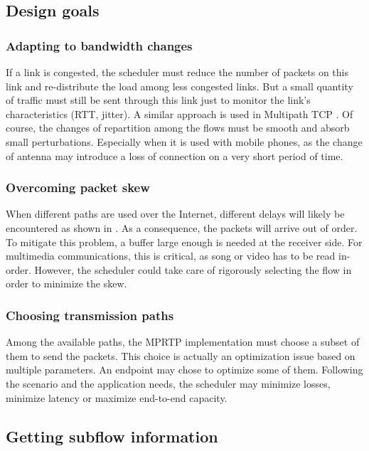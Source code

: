 \subsection{Design goals}

\subsubsection{Adapting to bandwidth changes}

If a link is congested, the scheduler must reduce the number of packets on this link and re-distribute the load among less congested links. But a small quantity of traffic must still be sent through this link just to monitor the link's characteristics (RTT, jitter). A similar approach is used in Multipath TCP \cite{wischik2011design}. Of course, the changes of repartition among the flows must be smooth and absorb small perturbations. Especially when it is used with mobile phones, as the change of antenna may introduce a loss of connection on a very short period of time.

\subsubsection{Overcoming packet skew}

When different paths are used over the Internet, different delays will likely be encountered as shown in \cite{PCVB13}. As a consequence, the packets will arrive out of order. To mitigate this problem, a buffer large enough is needed at the receiver side. For multimedia communications, this is critical, as song or video has to be read in-order. However, the scheduler could take care of rigorously selecting the flow in order to minimize the skew.

\subsubsection{Choosing transmission paths}

Among the available paths, the MPRTP implementation must choose a subset of them to send the packets. This choice is actually an optimization issue based on multiple parameters. An endpoint may chose to optimize some of them. Following the scenario and the application needs, the scheduler may minimize losses, minimize latency or maximize end-to-end capacity.

\subsection{Getting subflow information}

